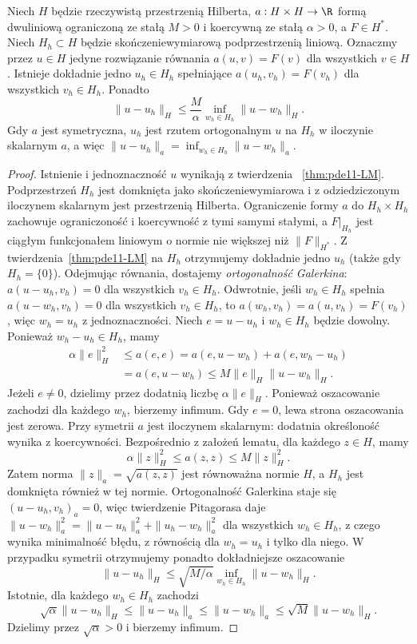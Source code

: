 \begin{twierdzenie}[Lemat C\'ei]
\label{thm:pde11-cea}
Niech $H$ będzie rzeczywistą przestrzenią Hilberta,
$a:H\times H\to\R$ formą dwuliniową ograniczoną
ze stałą $M>0$ i koercywną ze stałą $\alpha>0$,
a $F\in H^*$.
Niech $H_h\subset H$ będzie skończeniewymiarową
podprzestrzenią liniową. Oznaczmy przez $u\in H$
jedyne rozwiązanie równania $a(u,v)=F(v)$ dla wszystkich
$v\in H$. Istnieje dokładnie jedno $u_h\in H_h$
spełniające $a(u_h,v_h)=F(v_h)$ dla wszystkich $v_h\in H_h$.
Ponadto
\[
\|u-u_h\|_H\le\frac M\alpha
\inf_{w_h\in H_h}\|u-w_h\|_H.
\]
Gdy $a$ jest symetryczna, $u_h$ jest rzutem ortogonalnym
$u$ na $H_h$ w iloczynie skalarnym $a$, a więc
$\|u-u_h\|_a=\inf_{w_h\in H_h}\|u-w_h\|_a$.
\end{twierdzenie}
\begin{proof}
Istnienie i jednoznaczność $u$ wynikają z twierdzenia
~\ref{thm:pde11-LM}. Podprzestrzeń $H_h$ jest domknięta
jako skończeniewymiarowa i z odziedziczonym iloczynem
skalarnym jest przestrzenią Hilberta.
Ograniczenie formy $a$ do $H_h\times H_h$ zachowuje
ograniczoność i koercywność z tymi samymi stałymi,
a $F|_{H_h}$ jest ciągłym funkcjonałem liniowym
o normie nie większej niż $\|F\|_{H^*}$.
Z twierdzenia~\ref{thm:pde11-LM} na $H_h$ otrzymujemy
dokładnie jedno $u_h$ (także gdy $H_h=\{0\}$).
Odejmując równania, dostajemy \emph{ortogonalność Galerkina}:
$a(u-u_h,v_h)=0$ dla wszystkich $v_h\in H_h$.
Odwrotnie, jeśli $w_h\in H_h$ spełnia
$a(u-w_h,v_h)=0$ dla wszystkich $v_h\in H_h$,
to $a(w_h,v_h)=a(u,v_h)=F(v_h)$,
więc $w_h=u_h$ z jednoznaczności.
Niech $e=u-u_h$ i $w_h\in H_h$ będzie dowolny.
Ponieważ $w_h-u_h\in H_h$, mamy
\begin{align*}
\alpha\|e\|_H^2
&\le a(e,e)=a(e,u-w_h)+a(e,w_h-u_h)\\
&=a(e,u-w_h)\le M\|e\|_H\|u-w_h\|_H.
\end{align*}
Jeżeli $e\ne0$, dzielimy przez dodatnią liczbę
$\alpha\|e\|_H$. Ponieważ oszacowanie zachodzi
dla każdego $w_h$, bierzemy infimum. Gdy $e=0$,
lewa strona oszacowania jest zerowa.
Przy symetrii $a$ jest iloczynem skalarnym: dodatnia
określoność wynika z koercywności. Bezpośrednio z założeń
lematu, dla każdego $z\in H$, mamy
\[
 \alpha\|z\|_H^2\le a(z,z)\le M\|z\|_H^2.
\]
Zatem norma $\|z\|_a=\sqrt{a(z,z)}$ jest równoważna
normie $H$, a $H_h$ jest domknięta również w tej normie.
Ortogonalność Galerkina staje się
$(u-u_h,v_h)_a=0$, więc twierdzenie Pitagorasa
daje $\|u-w_h\|_a^2=\|u-u_h\|_a^2+
\|u_h-w_h\|_a^2$ dla wszystkich $w_h\in H_h$,
z czego wynika minimalność błędu, z równością
dla $w_h=u_h$ i tylko dla niego. W przypadku symetrii
otrzymujemy ponadto dokładniejsze oszacowanie
\[
 \|u-u_h\|_H\le\sqrt{M/\alpha}
             \inf_{w_h\in H_h}\|u-w_h\|_H.
\]
Istotnie, dla każdego $w_h\in H_h$ zachodzi
\[
 \sqrt{\alpha}\|u-u_h\|_H
 \le\|u-u_h\|_a\le\|u-w_h\|_a
 \le\sqrt M\|u-w_h\|_H.
\]
Dzielimy przez $\sqrt{\alpha}>0$ i bierzemy infimum.
\end{proof}

